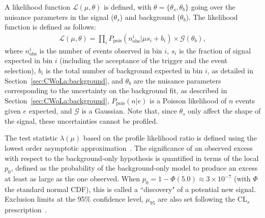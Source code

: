A likelihood function $\mathcal{L}(\mu,\theta)$ is defined, with $\theta=\{\theta_s,\theta_b\}$ going over the nuisance parameters in the signal ($\theta_s$) and background ($\theta_b$).
The likelihood function is defined as follows:
\begin{align}
  \mathcal{L}(\mu,\theta) = \prod_i P_\text{pois}(n_\text{obs}^i|\mu s_i + b_i)\times\mathcal{G}(\theta_b),
  \label{eqn:CWoLa:likelihood}
\end{align}
where $n_\text{obs}^i$ is the number of events observed in bin $i$,
$s_i$ is the fraction of signal expected in bin $i$ (including the acceptance of the trigger and the event selection),
$b_i$ is the total number of background expected in bin $i$,
as detailed in Section~\ref{sec:CWoLa:background},
and $\theta_b$ are the nuisance parameters corresponding to the uncertainty on the background fit, as described in Section~\ref{sec:CWoLa:background},
$P_\text{pois}(n|e)$ is a Poisson likelihood of $n$ events given $e$ expected, and $\mathcal{G}$ is a  Gaussian.
Note that, since $\theta_s$ only affect the shape of the signal, these uncertainties cannot be profiled.

The test statistic $\lambda(\mu)$ based on the profile likelihood ratio is defined using the lowest order asymptotic approximation~\cite{Cowan:2010js}.
The significance of an observed excess with respect to the background-only hypothesis is quantified in terms of the local $p_0$, defined as the probability of the background-only model to produce an excess at least as large as the one observed.
When $p_0 = 1-\Phi(5.0) \approx 3\times10^{-7}$ (with $\Phi$ the standard normal CDF), this is called a ``discovery" of a potential new signal.
Exclusion limits at the 95\% confidence level, $\mu_{95}$ are also set following the CL$_s$ prescription~\cite{Read:2002hq}.

